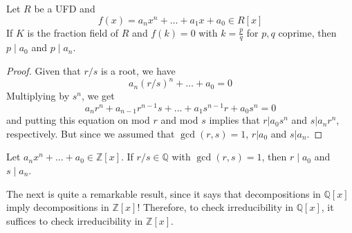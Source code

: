   \begin{theorem}
    Let $R$ be a UFD and 
    \begin{equation}
      f(x) = a_n x^n + \ldots + a_1 x + a_0 \in R[x] 
    \end{equation}
    If $K$ is the fraction field of $R$ and $f(k) = 0$ with $k = \frac{p}{q}$ for $p, q$ coprime, then $p \mid a_0$ and $p \mid a_n$. 
  \end{theorem}
  \begin{proof}
    Given that $r/s$ is a root, we have 
    \begin{equation}
      a_n (r/s)^n + \ldots + a_0 = 0
    \end{equation}
    Multiplying by $s^n$, we get 
    \begin{equation}
      a_n r^n + a_{n-1} r^{n-1} s + \ldots + a_1 s^{n-1} r + a_0 s^n = 0
    \end{equation}
    and putting this equation on mod $r$ and mod $s$ implies that $r | a_0 s^n$ and $s | a_n r^n$, respectively. But since we assumed that $\gcd (r, s) = 1$, $r | a_0$ and $s | a_n$. 
  \end{proof}

  \begin{corollary}
    Let $a_n x^n + \ldots + a_0 \in \mathbb{Z}[x]$. If $r/s \in \mathbb{Q}$ with $\gcd(r, s) = 1$, then $r \mid a_0$ and $s \mid a_n$. 
  \end{corollary}

  The next is quite a remarkable result, since it says that decompositions in $\mathbb{Q}[x]$ imply decompositions in $\mathbb{Z}[x]$! Therefore, to check irreducibility in $\mathbb{Q}[x]$, it suffices to check irreducibility in $\mathbb{Z}[x]$. 

